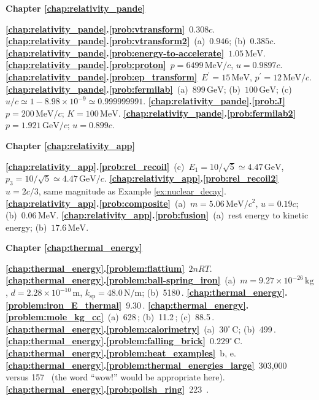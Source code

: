 \textbf{Chapter \ref{chap:relativity_pande}}



\textbf{\ref{chap:relativity_pande}.\ref{prob:vtransform}}~$0.308c$.
\textbf{\ref{chap:relativity_pande}.\ref{prob:vtransform2}}~(a)~$0.946$;
(b)~$0.385c$.
\textbf{\ref{chap:relativity_pande}.\ref{prob:energy-to-accelerate}}~$1.05\,\text{MeV}$. 
\textbf{\ref{chap:relativity_pande}.\ref{prob:proton}}~$p = 6499\,\text{MeV}/c$, $u = 0.9897c$.
\textbf{\ref{chap:relativity_pande}.\ref{prob:ep_transform}}~$E^\prime = 
15\,\text{MeV}$, $p^\prime = 12\,\text{MeV}/c$.
\textbf{\ref{chap:relativity_pande}.\ref{prob:fermilab}}~(a)~$899\,\text{GeV}$; 
(b)~$100\,\text{GeV}$; 
(c)~$u/c \simeq 1 - 8.98\times 10^{-9} \simeq 0.999999991$.
\textbf{\ref{chap:relativity_pande}.\ref{prob:J}}~$p = 200\,\text{MeV}/c$; 
$K = 100\,\text{MeV}$.
\textbf{\ref{chap:relativity_pande}.\ref{prob:fermilab2}}~$p = 1.921\,\text{GeV}/c$; $u = 0.899c$.


 \textbf{Chapter \ref{chap:relativity_app}}


\textbf{\ref{chap:relativity_app}.\ref{prob:rel_recoil}}~(c)~$E_1 = 
10/\sqrt{5} \simeq 4.47\,\text{GeV}$, 
$p_3 = 10/\sqrt{5} \simeq 4.47\,\text{GeV}/c$.
\textbf{\ref{chap:relativity_app}.\ref{prob:rel_recoil2}}~$u = 2c/3$, 
same magnitude as Example \ref{ex:nuclear_decay}.
\textbf{\ref{chap:relativity_app}.\ref{prob:composite}}~(a)~$m = 
5.06\,\text{MeV}/c^2$, $u = 0.19c$; (b)~$0.06\,\text{MeV}$.
\textbf{\ref{chap:relativity_app}.\ref{prob:fusion}}~(a)~rest energy to 
kinetic energy; (b)~$17.6\,\text{MeV}$.






 \textbf{Chapter \ref{chap:thermal_energy}}

 
\textbf{\ref{chap:thermal_energy}.\ref{problem:flattium}}~$2nRT$.
\textbf{\ref{chap:thermal_energy}.\ref{problem:ball-spring_iron}}~(a)~$m=9.27
\times 10^{-26}\,\text{kg}$, $d=2.28\times 10^{-10}\,\text{m}$, 
$k_\text{sp}=48.0\,\text{N/m}$; (b)~5180\,.
\textbf{\ref{chap:thermal_energy}.\ref{problem:iron_E_thermal}}~9.30\,.
\textbf{\ref{chap:thermal_energy}.\ref{problem:mole_kg_cc}}~(a)~628\,; 
(b)~11.2\,; (c)~88.5\,.
\textbf{\ref{chap:thermal_energy}.\ref{problem:calorimetry}}~(a)~$30^\circ\,\text{C}$; (b)~499\,.
\textbf{\ref{chap:thermal_energy}.\ref{problem:falling_brick}}~$0.229^\circ\,\text{C}$.
\textbf{\ref{chap:thermal_energy}.\ref{problem:heat_examples}}~b, e.
\textbf{\ref{chap:thermal_energy}.\ref{problem:thermal_energies_large}}~303,000 \, versus 157 \, (the word ``wow!'' would be appropriate here).
\textbf{\ref{chap:thermal_energy}.\ref{prob:polish_ring}}~223 \,.



